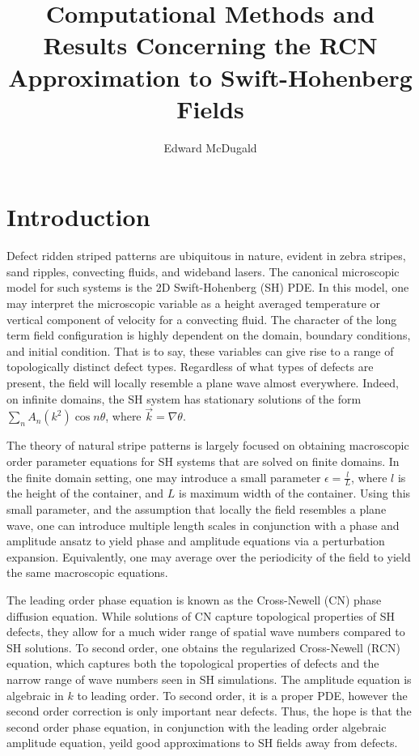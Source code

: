 \documentclass[12pt]{article}
\title{Computational Methods and Results Concerning the RCN Approximation to Swift-Hohenberg Fields}
\author{Edward McDugald}
\numberwithin{equation}{section}
\begin{document}
\maketitle

\section{Introduction}
\par Defect ridden striped patterns are ubiquitous in nature, evident in zebra stripes, sand ripples, convecting fluids, and wideband lasers. The canonical microscopic model for such systems is the 2D Swift-Hohenberg (SH) PDE. In this model, one may interpret the microscopic variable as a height averaged temperature or vertical component of velocity for a convecting fluid. The character of the long term field configuration is highly dependent on the domain, boundary conditions, and initial condition. That is to say, these variables can give rise to a range of topologically distinct defect types. Regardless of what types of defects are present, the field will locally resemble a plane wave almost everywhere. Indeed, on infinite domains, the SH system has stationary solutions of the form $\sum_{n}A_n(k^2)\cos{n\theta}$, where $\vec{k} = \nabla \theta$.
\par The theory of natural stripe patterns is largely focused on obtaining macroscopic order parameter equations for SH systems that are solved on finite domains. In the finite domain setting, one may introduce a small parameter $\epsilon = \frac{l}{L}$, where $l$ is the height of the container, and $L$ is maximum width of the container. Using this small parameter, and the assumption that locally the field resembles a plane wave, one can introduce multiple length scales in conjunction with a phase and amplitude ansatz to yield phase and amplitude equations via a perturbation expansion. Equivalently, one may average over the periodicity of the field to yield the same macroscopic equations.
\par The leading order phase equation is known as the Cross-Newell (CN) phase diffusion equation. While solutions of CN capture topological properties of SH defects, they allow for a much wider range of spatial wave numbers compared to SH solutions. To second order, one obtains the regularized Cross-Newell (RCN) equation, which captures both the topological properties of defects and the narrow range of wave numbers seen in SH simulations. The amplitude equation is algebraic in $k$ to leading order. To second order, it is a proper PDE, however the second order correction is only important near defects. Thus, the hope is that the second order phase equation, in conjunction with the leading order algebraic amplitude equation, yeild good approximations to SH fields away from defects.
\end{document}
